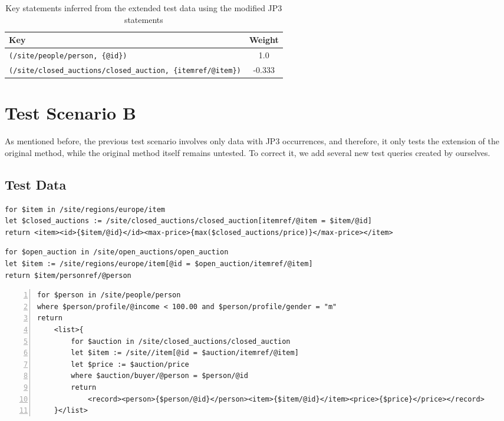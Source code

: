 \begin{table}
\begin{tabular}{|l|c|}
\hline
\textbf{Key} & \textbf{Weight} \\ \hline \hline
\texttt{(/site/people/person, \{@id\})} & 1.0 \\ \hline
\texttt{(/site/closed\_auctions/closed\_auction, \{itemref/@item\})} & -0.333 \\ \hline
\end{tabular}
\caption[Key statements inferred using the modified JP3 statements]{Key statements inferred from the extended test data using the modified JP3 statements}
\label{TAB_inferred_keys_3}
\end{table}

\section{Test Scenario B}
As mentioned before, the previous test scenario involves only data with JP3 occurrences, and therefore, it only tests the extension of the original method, while the original method itself remains untested. To correct it, we add several new test queries created by ourselves.

\subsection{Test Data}

\begin{lstlisting}[caption=Test query B1 containing a for join pattern occurrence., frame=single, label=listing_test_query_b1]
for $item in /site/regions/europe/item
let $closed_auctions := /site/closed_auctions/closed_auction[itemref/@item = $item/@id]
return <item><id>{$item/@id}</id><max-price>{max($closed_auctions/price)}</max-price></item>
\end{lstlisting}

\begin{lstlisting}[caption=Test query B2 containing a let join pattern occurrence., frame=single, label=listing_test_query_b2]
for $open_auction in /site/open_auctions/open_auction
let $item := /site/regions/europe/item[@id = $open_auction/itemref/@item]
return $item/personref/@person
\end{lstlisting}

\begin{lstlisting}[caption=Test query B3 containing let join pattern and JP3 occurrences., frame=single, label=listing_test_query_b3, numbers=left, numberstyle=\tiny]
for $person in /site/people/person
where $person/profile/@income < 100.00 and $person/profile/gender = "m"
return
    <list>{
        for $auction in /site/closed_auctions/closed_auction
        let $item := /site//item[@id = $auction/itemref/@item]
        let $price := $auction/price
        where $auction/buyer/@person = $person/@id
        return
            <record><person>{$person/@id}</person><item>{$item/@id}</item><price>{$price}</price></record>
    }</list>
\end{lstlisting}

